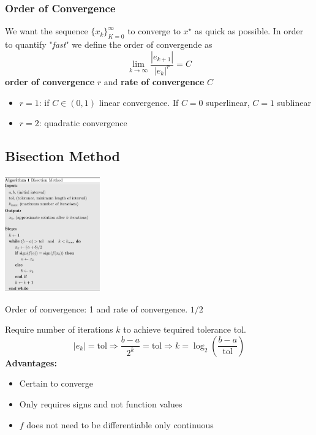         \subsubsection{Order of Convergence}
            We want the sequence $\{x_k\}_{K=0}^{\infty}$ to converge to $x^\star$ as quick as possible. In order to quantify "\textit{fast}" we define the order of convergende as
            \begin{equation*}
                \lim_{k\to\infty}\frac{|e_{k+1}|}{|e_k|^r}= C
            \end{equation*}
            \textbf{order of convergence} $r$ and \textbf{rate of convergence} $C$
            \begin{itemize}
                \item $r=1$: if $C\in(0,1)$ linear convergence. If $C = 0$ superlinear, $C = 1$ sublinear
                \item $r=2$: quadratic convergence
            \end{itemize}{}

\subsection{Bisection Method}
    \begin{center}
        \includegraphics[width=0.9\linewidth, height = 50mm]{images/02/bisection.jpeg}
    \end{center}
    Order of convergence: 1 and rate of convergence. $1/2$
    
    Require number of iterations $k$ to achieve tequired tolerance tol.
    \begin{equation*}
        |e_k| = \textrm{tol} \Rightarrow \frac{b-a}{2^k}=\textrm{tol} \Rightarrow k = \log_2\left(\frac{b-a}{\textrm{tol}}\right)
    \end{equation*}
    \textbf{Advantages:}
    \begin{itemize}
        \item Certain to converge
        \item Only requires signs and not function values
        \item $f$ does not need to be differentiable only continuous
    \end{itemize}
    
